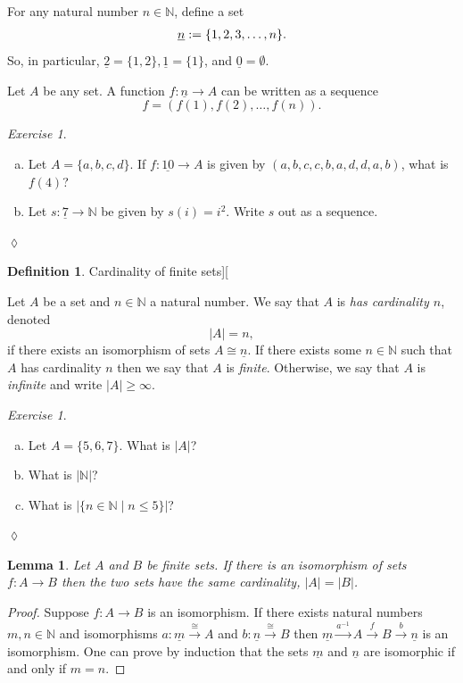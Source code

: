 \documentclass{book}
\def\NN{{\mathbb N}}
\def\to{\rightarrow}
\def\taking{\colon}
\def\iso{\cong}
\def\|{{\;|\;}}
\def\m1{{-1}}
\def\ul{\underline}
\newcommand{\To}[1]{\xrightarrow{#1}}
\newtheorem{lemma}[subsubsection]{Lemma}
\theoremstyle{remark}
\newtheorem{exc}[subsubsection]{Exercise}
\newenvironment{exercise}{\begin{exc}}{\hspace*{\fill}$\lozenge$\end{exc}}
\theoremstyle{definition}
\newtheorem{definition}[subsubsection]{Definition}
\def\sexc{\begin{enumerate}[a.)]\setlength{\itemsep}{.1cm}\setlength{\parskip}{.1cm}\item}
\def\next{\item}
\def\endsexc{\end{enumerate}}
\begin{document}
For any natural number $n\in\NN$, define a set 
\begin{align}\label{dia:underline n}\index{a symbol!$\ul{n}$}
\ul{n}:=\{1,2,3,\ldots,n\}.
\end{align}
So, in particular, $\ul{2}=\{1,2\}, \ul{1}=\{1\}$, and $\ul{0}=\emptyset$. 

Let $A$ be any set. A function $f\taking\ul{n}\to A$ can be written as a sequence $$f=(f(1),f(2),\ldots,f(n)).$$

\begin{exercise}\label{exc:sequence}~
\sexc Let $A=\{a,b,c,d\}$. If $f\taking\ul{10}\to A$ is given by $(a,b,c,c,b,a,d,d,a,b)$, what is $f(4)$?
\next Let $s\taking\ul{7}\to\NN$ be given by $s(i)=i^2$. Write $s$ out as a sequence.
\endsexc
\end{exercise}

\begin{definition}Cardinality of finite sets]\label{def:cardinality}[

Let $A$ be a set and $n\in\NN$ a natural number. We say that $A$ is {\em has cardinality $n$}, denoted $$|A|=n,$$ if there exists an isomorphism of sets $A\iso\ul{n}$. If there exists some $n\in\NN$ such that $A$ has cardinality $n$ then we say that $A$ is {\em finite}. Otherwise, we say that $A$ is {\em infinite} and write $|A|\geq\infty$.

\end{definition}

\begin{exercise}~
\sexc Let $A=\{5,6,7\}$. What is $|A|$? 
\next What is $|\NN|$? 
\next What is $|\{n\in\NN\|n\leq 5\}|$?
\endsexc
\end{exercise}

\begin{lemma}

Let $A$ and $B$ be finite sets. If there is an isomorphism of sets $f\taking A\to B$ then the two sets have the same cardinality, $|A|=|B|$.

\end{lemma}

\begin{proof}

Suppose $f\taking A\to B$ is an isomorphism. If there exists natural numbers $m,n\in\NN$ and isomorphisms $a\taking\ul{m}\To\iso A$ and $b\taking\ul{n}\To\iso B$ then $\ul{m}\To{a^\m1}A\To{f}B\To{b}\ul{n}$ is an isomorphism. One can prove by induction that the sets $\ul{m}$ and $\ul{n}$ are isomorphic if and only if $m=n$. 

\end{proof}
\end{document}
